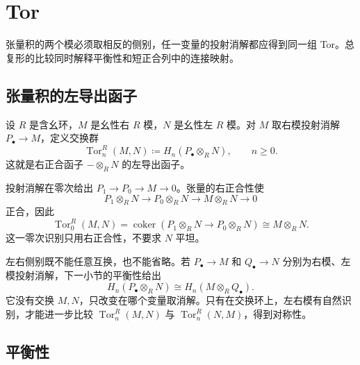 
\section{Tor}
\label{b4:sec:0803}

张量积的两个模必须取相反的侧别，任一变量的投射消解都应得到同一组 Tor。总复形的比较同时解释平衡性和短正合列中的连接映射。


%
%

\subsection{张量积的左导出函子}
\label{b4:subsec:0803:01}

\begin{definition}\label{b4:def:tor}
	设 \(R\) 是含幺环，\(M\) 是幺性右 \(R\) 模，\(N\) 是幺性左 \(R\) 模。对 \(M\) 取右模投射消解 \(P_\bullet\to M\)，定义交换群
	\[
		\operatorname{Tor}_n^R(M,N)\coloneqq H_n(P_\bullet\otimes_R N),\qquad n\ge0.
	\]
	这就是右正合函子 \(-\otimes_R N\) 的左导出函子。
\end{definition}

投射消解在零次给出 \(P_1\to P_0\to M\to0\)。张量的右正合性使
\[
	P_1\otimes_RN\longrightarrow P_0\otimes_RN \longrightarrow M\otimes_RN\longrightarrow0
\]
正合，因此
\[
	\operatorname{Tor}_0^R(M,N) =\operatorname{coker}(P_1\otimes_RN\to P_0\otimes_RN) \cong M\otimes_RN.
\]
这一零次识别只用右正合性，不要求 \(N\) 平坦。

\ProseParagraphBreak
左右侧别既不能任意互换，也不能省略。若 \(P_\bullet\to M\) 和 \(Q_\bullet\to N\) 分别为右模、左模投射消解，下一小节的平衡性给出
\[
	H_n(P_\bullet\otimes_RN)\cong H_n(M\otimes_RQ_\bullet).
\]
它没有交换 \(M,N\)，只改变在哪个变量取消解。只有在交换环上，左右模有自然识别，才能进一步比较 \(\operatorname{Tor}_n^R(M,N)\) 与 \(\operatorname{Tor}_n^R(N,M)\)，得到对称性。

\subsection{平衡性}
\label{b4:subsec:0803:02}

